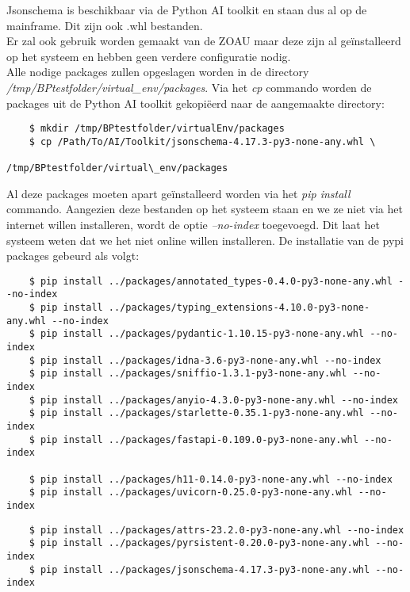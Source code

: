 Jsonschema is beschikbaar via de Python AI toolkit en staan dus al op de mainframe. Dit zijn ook .whl bestanden. \\

Er zal ook gebruik worden gemaakt van de ZOAU maar deze zijn al geïnstalleerd op het systeem en hebben geen verdere configuratie nodig. \\

Alle nodige packages zullen opgeslagen worden in de directory \textit{/tmp/BPtestfolder/virtual\_env/packages}. Via het \textit{cp} commando worden de packages uit de Python AI toolkit gekopiëerd naar de aangemaakte directory: \\

\begin{lstlisting}
    $ mkdir /tmp/BPtestfolder/virtualEnv/packages
    $ cp /Path/To/AI/Toolkit/jsonschema-4.17.3-py3-none-any.whl \
                                         /tmp/BPtestfolder/virtual\_env/packages
\end{lstlisting} 

Al deze packages moeten apart geïnstalleerd worden via het \textit{pip install} commando. Aangezien deze bestanden op het systeem staan en we ze niet via het internet willen installeren, wordt de optie \textit{--no-index} toegevoegd. Dit laat het systeem weten dat we het niet online willen installeren. De installatie van de pypi packages gebeurd als volgt:\\
\begin{lstlisting}
    $ pip install ../packages/annotated_types-0.4.0-py3-none-any.whl --no-index
    $ pip install ../packages/typing_extensions-4.10.0-py3-none-any.whl --no-index
    $ pip install ../packages/pydantic-1.10.15-py3-none-any.whl --no-index
    $ pip install ../packages/idna-3.6-py3-none-any.whl --no-index
    $ pip install ../packages/sniffio-1.3.1-py3-none-any.whl --no-index
    $ pip install ../packages/anyio-4.3.0-py3-none-any.whl --no-index
    $ pip install ../packages/starlette-0.35.1-py3-none-any.whl --no-index
    $ pip install ../packages/fastapi-0.109.0-py3-none-any.whl --no-index
    
    $ pip install ../packages/h11-0.14.0-py3-none-any.whl --no-index
    $ pip install ../packages/uvicorn-0.25.0-py3-none-any.whl --no-index
\end{lstlisting}

\begin{lstlisting}
    $ pip install ../packages/attrs-23.2.0-py3-none-any.whl --no-index
    $ pip install ../packages/pyrsistent-0.20.0-py3-none-any.whl --no-index
    $ pip install ../packages/jsonschema-4.17.3-py3-none-any.whl --no-index
    
\end{lstlisting}

